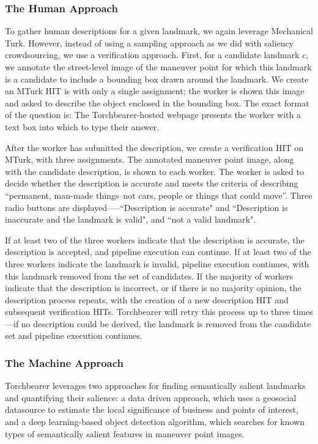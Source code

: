 \subsubsection{The Human Approach}\label{Sect:desc:human}
To gather human descriptions for a given landmark, we again leverage Mechanical Turk. However, instead of using a sampling approach as we did with saliency crowdsourcing, we use a verification approach.
First, for a candidate landmark $c$, we annotate the street-level image of the maneuver point for which this landmark is a candidate to include a bounding box drawn around the landmark. We create an MTurk HIT is with only a single assignment; the worker is shown this image and asked to describe the object enclosed in the bounding box. The exact format of the question is:  The Torchbearer-hosted webpage presents the worker with a text box into which to type their answer.

After the worker has submitted the description, we create a verification HIT on MTurk, with three assignments. The annotated maneuver point image, along with the candidate description, is shown to each worker. The worker is asked to decide whether the description is accurate and meets the criteria of describing “permanent, man-made things--not cars, people or things that could move”. Three radio buttons are displayed—--``Description is accurate" and ``Description is inaccurate and the landmark is valid", and ``not a valid landmark".

If at least two of the three workers indicate that the description is accurate, the description is accepted, and pipeline execution can continue. If at least two of the three workers indicate the landmark is invalid, pipeline execution continues, with this landmark removed from the set of candidates. If the majority of workers indicate that the description is incorrect, or if there is no majority opinion, the description process repeats, with the creation of a new description HIT and subsequent verification HITs. Torchbearer will retry this process up to three times---if no description could be derived, the landmark is removed from the candidate set and pipeline execution continues.

\subsubsection{The Machine Approach}
Torchbearer leverages two approaches for finding semantically salient landmarks and quantifying their salience: a data driven approach, which uses a geosocial datasource to estimate the local significance of business and points of interest, and a deep learning-based object detection algorithm, which searches for known types of semantically salient features in maneuver point images.
	
